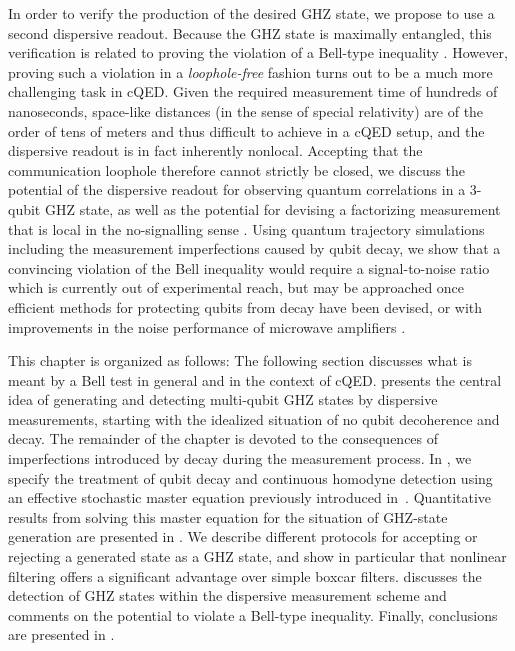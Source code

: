 In order to verify the production of the desired GHZ state, we propose to use a second dispersive readout. Because the GHZ state is maximally entangled, this verification is related to proving the violation of a Bell-type inequality \cite{bell_problem_1966, aspect_experimental_1981}. However, proving such a violation in a \textit{loophole-free} fashion turns out to be a much more challenging task in cQED\@. Given the required measurement time of hundreds of nanoseconds, space-like distances (in the sense of special relativity) are of the order of tens of meters and thus difficult to achieve in a cQED setup, and the dispersive readout is  in fact inherently nonlocal. Accepting that the communication loophole therefore cannot strictly be closed, we discuss the potential of the dispersive readout for observing quantum correlations in a 3-qubit GHZ state, as well as the potential for devising a factorizing measurement that is local in the no-signalling sense \cite{dieks_inequalities_2002}. Using quantum trajectory simulations including the measurement imperfections caused by qubit decay, we show that a convincing violation of the Bell inequality would require a signal-to-noise ratio which is currently out of experimental reach, but may be approached once efficient methods for protecting qubits from decay have been devised, or with improvements in the noise performance of microwave amplifiers \cite{bergeal_analog_2008}.

This chapter is organized as follows: The following section discusses what is meant by a Bell test in general and in the context of cQED\@.  presents the central idea of generating and detecting multi-qubit GHZ states by dispersive measurements, starting with the idealized situation of no qubit decoherence and decay. The remainder of the chapter is devoted to the consequences of imperfections introduced by decay during the measurement process. In , we specify the treatment of qubit decay and continuous homodyne detection using an effective stochastic master equation previously introduced in~\cite{hutchison_quantum_2008}. Quantitative results from solving this master equation for the situation of GHZ-state generation are presented in . We describe different protocols for accepting or rejecting a generated state as a GHZ state, and show in particular that nonlinear filtering offers a significant advantage over simple boxcar filters.  discusses the detection of GHZ states within the dispersive measurement scheme and comments on the potential to violate a Bell-type inequality. Finally, conclusions are presented in .

